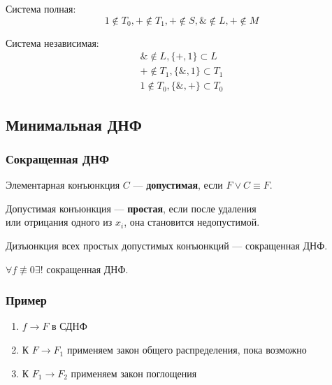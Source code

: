 \documentclass{article}
\begin{document}
Система полная:
\[
	1 \not \in T_0, + \not \in T_1, + \not \in S, \& \not \in L, + \not \in M
\]

Система независимая:
\begin{gather*}
	\& \not \in L, \{ +, 1 \} \subset L \\
	+ \not \in T_1, \{ \&, 1 \} \subset T_1 \\
	1 \not \in T_0, \{ \&, + \} \subset T_0
\end{gather*}

\subsection{Минимальная ДНФ}

\subsubsection{Сокращенная ДНФ}

Элементарная конъюнкция $C$ --- \textbf{допустимая}, если $F \lor C \equiv F$.

Допустимая конъюнкция --- \textbf{простая}, если после удаления \\
или отрицания одного из $x_i$, она становится недопустимой.

Дизъюнкция всех простых допустимых конъюнкций --- сокращенная ДНФ.

$\forall f \not \equiv 0 \exists !$ сокращенная ДНФ.

\subsubsection*{Пример}

\begin{enumerate}
	\item $f \to F$ в СДНФ
	\item К $F \to F_1$ применяем закон общего распределения, пока возможно
	\item К $F_1 \to F_2$ применяем закон поглощения
\end{enumerate}
\end{document}
